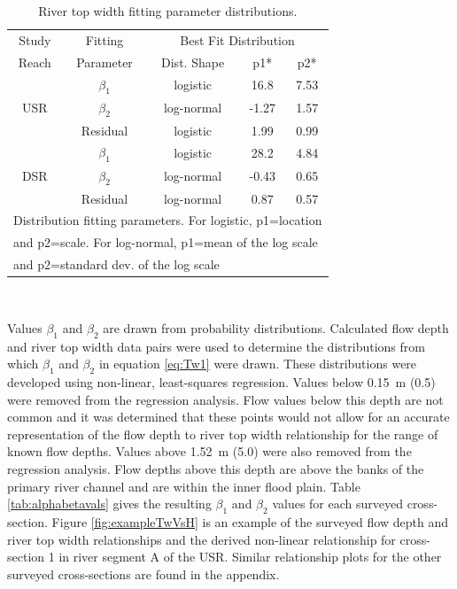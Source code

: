 \begin{linenumbers}
\begin{table}[htbp]
	\centering
	\caption[River top width fitting parameter distributions.]{River top width fitting parameter distributions.}
	\label{tab:TwFitting}
	\begin{tabular}{ccccc}
		\toprule
		Study                & Fitting   & \multicolumn{3}{c}{Best Fit Distribution} \\ \cmidrule(r{.5em}l){3-5}
		Reach                & Parameter & Dist. Shape      & p1*        & p2*       \\
		\toprule
		\multirow{3}{*}{USR} & $\beta_1$ & logistic         & 16.8       & 7.53      \\
		& $\beta_2$ & log-normal       & -1.27      & 1.57      \\
		& Residual  & logistic         & 1.99       & 0.99      \\
		\midrule
		\multirow{3}{*}{DSR} & $\beta_1$ & logistic         & 28.2       & 4.84      \\
		& $\beta_2$ & log-normal       & -0.43      & 0.65      \\
		& Residual  & log-normal       & 0.87       & 0.57      \\
		\bottomrule
		\multicolumn{5}{l}{{\footnotesize * Distribution fitting parameters.  For logistic, p1=location }}\\
		\multicolumn{5}{l}{\footnotesize{and p2=scale.  For log-normal, p1=mean of the log scale }}\\
		\multicolumn{5}{l}{\footnotesize{and p2=standard dev. of the log scale}}\\
	\end{tabular}\\
\end{table}

Values $\beta_1$ and $\beta_2$ are drawn from probability distributions.  Calculated flow depth and river top width data pairs were used to determine the distributions from which $\beta_1$ and $\beta_2$ in equation \ref{eq:Tw1} were drawn.  These distributions were developed using non-linear, least-squares regression.  Values below \SI{0.15}{\meter} (\SI{0.5}{\foot}) were removed from the regression analysis.  Flow values below this depth are not common and it was determined that these points would not allow for an accurate representation of the flow depth to river top width relationship for the range of known flow depths.  Values above \SI{1.52}{\meter} (\SI{5.0}{\foot}) were also removed from the regression analysis.  Flow depths above this depth are above the banks of the primary river channel and are within the inner flood plain.  Table \ref{tab:alphabetavals} gives the resulting $\beta_1$ and $\beta_2$ values for each surveyed cross-section.  Figure \ref{fig:exampleTwVsH} is an example of the surveyed flow depth and river top width relationships and the derived non-linear relationship for cross-section 1 in river segment A of the USR.  Similar relationship plots for the other surveyed cross-sections are found in the appendix. 


\end{linenumbers}
